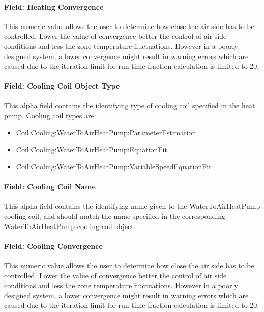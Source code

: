 \paragraph{Field: Heating Convergence}\label{field-heating-convergence}

This numeric value allows the user to determine how close the air side has to be controlled. Lower the value of convergence better the control of air side conditions and less the zone temperature fluctuations. However in a poorly designed system, a lower convergence might result in warning errors which are caused due to the iteration limit for run time fraction calculation is limited to 20.

\paragraph{Field: Cooling Coil Object Type}\label{field-cooling-coil-object-type-5}

This alpha field contains the identifying type of cooling coil specified in the heat pump. Cooling coil types are:

\begin{itemize}
\item
  Coil:Cooling:WaterToAirHeatPump:ParameterEstimation
\item
  Coil:Cooling:WaterToAirHeatPump:EquationFit
\item
  Coil:Cooling:WaterToAirHeatPump:VariableSpeedEquationFit
\end{itemize}

\paragraph{Field: Cooling Coil Name}\label{field-cooling-coil-name-5}

This alpha field contains the identifying name given to the WaterToAirHeatPump cooling coil, and should match the name specified in the corresponding WaterToAirHeatPump cooling coil object.

\paragraph{Field: Cooling Convergence}\label{field-cooling-convergence}

This numeric value allows the user to determine how close the air side has to be controlled. Lower the value of convergence better the control of air side conditions and less the zone temperature fluctuations. However in a poorly designed system, a lower convergence might result in warning errors which are caused due to the iteration limit for run time fraction calculation is limited to 20.

